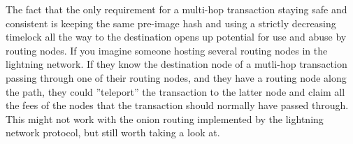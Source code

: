 \begin{itemize}
	The fact that the only requirement for a multi-hop transaction staying safe and consistent is keeping the same pre-image hash and using a strictly decreasing timelock all the way to the destination opens up potential for use and abuse by routing nodes. If you imagine someone hosting several routing nodes in the lightning network. If they know the destination node of a mutli-hop transaction passing through one of their routing nodes, and they have a routing node along the path, they could ''teleport'' the transaction to the latter node and claim all the fees of the nodes that the transaction should normally have passed through. This might not work with the onion routing implemented by the lightning network protocol, but still worth taking a look at.
\end{itemize}